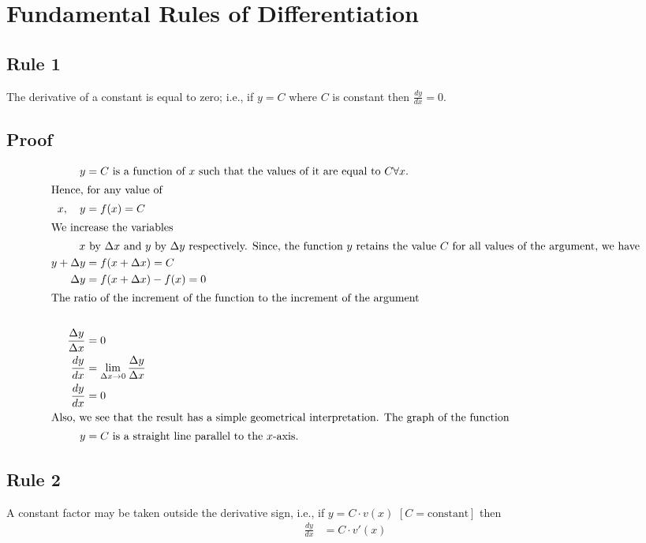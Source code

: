 \documentclass{article}
\begin{document}
\section*{Fundamental Rules of Differentiation}

\subsection*{Rule 1}
The derivative of a constant is equal to zero; i.e., if \(y = C\) where \(C\) is constant then \(\frac{dy}{dx} = 0\).

\subsection*{Proof}
\begin{align*}
y &= C \text{ is a function of } x \text{ such that the values of it are equal to } C \forall x. \\
\intertext{Hence, for any value of } x, \quad y &= f(x) = C \\
\intertext{We increase the variables } x & \text{ by } \Delta x \text{ and } y \text{ by } \Delta y \text{ respectively. Since, the function } y \text{ retains the value } C \text{ for all values of the argument, we have} \\
y + \Delta y &= f(x + \Delta x) = C \\
\Delta y &= f(x + \Delta x) - f(x) = 0 \\
\intertext{The ratio of the increment of the function to the increment of the argument} \\
\frac{\Delta y}{\Delta x} &= 0 \\
\frac{dy}{dx} &= \lim_{\Delta x \to 0} \frac{\Delta y}{\Delta x} \\
\frac{dy}{dx} &= 0 \\
\intertext{Also, we see that the result has a simple geometrical interpretation. The graph of the function } y &= C \text{ is a straight line parallel to the } x\text{-axis.}
\end{align*}

\subsection*{Rule 2}
A constant factor may be taken outside the derivative sign, i.e., if \(y = C \cdot v(x)\) \([C = \text{constant}]\) then
\begin{align*}
\frac{dy}{dx} &= C \cdot v'(x)
\end{align*}
\end{document}

